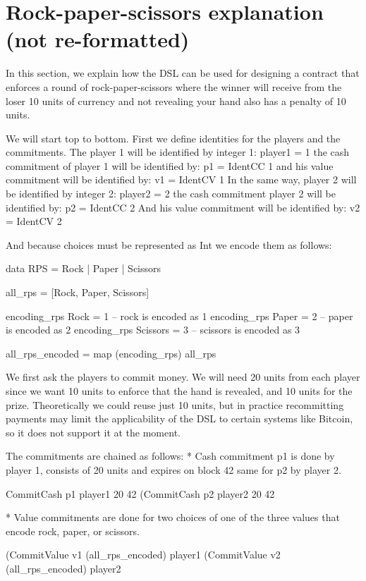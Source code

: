 \documentclass[
      acmsmall
    , screen
    , review=true
  ]{acmart}
\begin{document}
\section{Rock-paper-scissors explanation (not re-formatted)}

In this section, we explain how the DSL can be used for designing a contract that enforces a round of rock-paper-scissors where the winner will receive from the loser 10 units of currency and not revealing your hand also has a penalty of 10 units.


We will start top to bottom. First we define identities for the players and the commitments.
The player 1 will be identified by integer 1:
player1 = 1
the cash commitment of player 1 will be identified by:
p1 = IdentCC 1
and his value commitment will be identified by:
v1 = IdentCV 1
In the same way, player 2 will be identified by integer 2:
player2 = 2
the cash commitment player 2 will be identified by:
p2 = IdentCC 2
And his value commitment will be identified by:
v2 = IdentCV 2


And because choices must be represented as Int we encode them as follows:


data RPS = Rock | Paper | Scissors


all\_rps = [Rock, Paper, Scissors]


encoding\_rps Rock = 1      -- rock is encoded as 1
encoding\_rps Paper = 2     -- paper is encoded as 2
encoding\_rps Scissors = 3  -- scissors is encoded as 3


all\_rps\_encoded = map (encoding\_rps) all\_rps


We first ask the players to commit money. We will need 20 units from each player since we want 10 units to enforce that the hand is revealed, and 10 units for the prize. Theoretically we could reuse just 10 units, but in practice recommitting payments may limit the applicability of the DSL to certain systems like Bitcoin, so it does not support it at the moment.


The commitments are chained as follows:
* Cash commitment p1 is done by player 1, consists of 20 units and expires on block 42 same for p2 by player 2.


CommitCash p1 player1 20 42
  (CommitCash p2 player2 20 42 


* Value commitments are done for two choices of one of the three values that encode rock, paper, or scissors.


     (CommitValue v1 (all\_rps\_encoded) player1
        (CommitValue v2 (all\_rps\_encoded) player2
\end{document}
